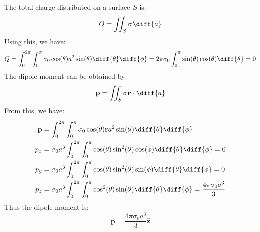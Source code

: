 \documentclass[crop=false,class=book,oneside]{standalone}
\begin{document}
            \begin{solution}
                The total charge distributed on a surface $S$ is:
                \begin{equation}
                    Q=\iint_{S}\sigma\diff{a}
                \end{equation}
                Using this, we have:
                \begin{equation}
                    Q=\int_{0}^{2\pi}\int_{0}^{\pi}
                    \sigma_{0}\cos(\theta)a^{2}\sin(\theta)
                    \diff{\theta}\diff{\phi}
                    =2\pi\sigma_{0}\int_{0}^{\pi}
                    \sin(\theta)\cos(\theta)\diff{\theta}
                    =0
                \end{equation}
                The dipole moment can be obtained by:
                \begin{equation}
                    \mathbf{p}=\iint_{S}\sigma\mathbf{r}\cdot\diff{a}
                \end{equation}
                From this, we have:
                \begin{subequations}
                    \begin{align}
                        \mathbf{p}&=
                        \int_{0}^{2\pi}\int_{0}^{\pi}\sigma_{0}\cos(\theta)
                            \mathbf{r}a^{2}\sin(\theta)
                            \diff{\theta}\diff{\phi}\\
                        p_{x}&=
                        \sigma_{0}a^{3}\int_{0}^{2\pi}\int_{0}^{\pi}
                            \cos(\theta)\sin^{2}(\theta)\cos(\phi)
                            \diff{\theta}\diff{\phi}=0\\
                        p_{y}&=\sigma_{0}a^{3}\int_{0}^{2\pi}\int_{0}^{\pi}
                            \cos(\theta)\sin^{2}(\theta)\sin(\phi)
                            \diff{\theta}\diff{\phi}=0\\
                        p_{z}&=\sigma_{0}a^{3}\int_{0}^{2\pi}\int_{0}^{\pi}
                            \cos^{2}(\theta)\sin(\theta)
                            \diff{\theta}\diff{\phi}
                            =\frac{4\pi\sigma_{0}a^{3}}{3}
                    \end{align}
                \end{subequations}
                Thus the dipole moment is:
                \begin{equation}
                    \mathbf{p}=
                    \frac{4\pi\sigma_{0}a^{3}}{3}\hat{\mathbf{z}}

\end{equation}
\end{solution}
\end{document}
